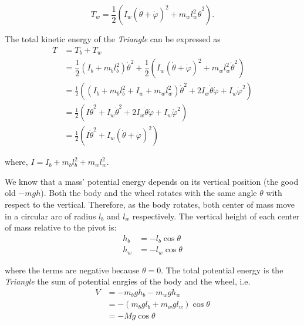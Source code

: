\documentclass{article}
\begin{document}
\begin{equation}
  T_w=\dfrac{1}{2}\left(I_{w}(\dot{\theta}+\dot{\varphi})^{2}+m_{w}l_{w}^{2}\dot{\theta}^2\right).
\end{equation}

The total kinetic energy of the \textit{Triangle} can be expressed as
\begin{equation}
  \begin{split}
    T&=T_{b}+T_{w}\\
    &=\dfrac{1}{2}\left(I_{b} + m_{b} l_{b}^{2}\right)\dot{\theta}^{2}+\dfrac{1}{2}\left(I_{w}(\dot{\theta}+\dot{\varphi})^{2}+m_{w}l_{w}^{2}\dot{\theta}^2\right)\\
    &= \frac{1}{2}\left(\left(I_b+m_{b}l_{b}^{2}+I_{w}+m_{w}l_{w}^{2}\right)\dot{\theta}^2+2I_{w}\dot{\theta}\dot{\varphi}+I_{w}\dot{\varphi}^2\right)\\
    &= \frac{1}{2}\left(I\dot{\theta}^2+I_{w}\dot{\theta}^{2}+2I_{w}\dot{\theta}\dot{\varphi}+I_{w}\dot{\varphi}^2\right)\\
    &= \frac{1}{2}\left(I\dot{\theta}^{2}+I_{w}(\dot{\theta}+\dot{\varphi})^{2}\right)
  \end{split}
\end{equation}

where, $I=I_b+m_{b}l_{b}^{2}+m_{w}l_{w}^{2}$.

We know that a mass' potential energy depends on its vertical position (the good old $-mgh$). Both the body and the wheel rotates with the same angle $\theta$ with respect to the vertical. Therefore, as the body rotates, both center of mass move in a circular arc of radius $l_{b}$ and $l_{w}$ respectively. The vertical height of each center of mass relative to the pivot is:
\begin{equation*}
  \begin{split}
    h_{b}&=-l_{b}\cos\theta\\
    h_{w}&=-l_{w}\cos\theta
  \end{split}
\end{equation*}

where the terms are negative because $\theta=0$. The total potential energy is the \textit{Triangle} the sum of potential enrgies of the body and the wheel, i.e.
\begin{equation}
  \begin{split}
    V&=-m_{b}gh_{b}-m_{w}gh_{w}\\
    &=-(m_{b}gl_{b}+m_{w}gl_{w})\cos\theta\\
    &=-Mg\cos\theta
  \end{split}
\end{equation}
\end{document}

